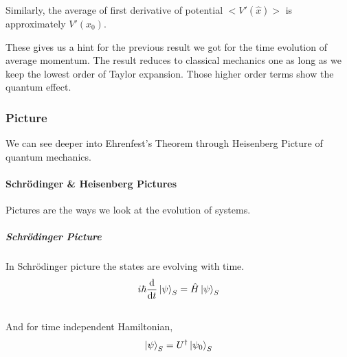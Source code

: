 \documentclass[letterpaper,10pt,english]{sphinxmanual}
\def\d{{\rm d}}
\begin{document}
Similarly, the average of first derivative of potential $<V'(\hat x)>$ is approximately $V'(x_0)$.

These gives us a hint for the previous result we got for the time evolution of average momentum. The result reduces to classical mechanics one as long as we keep the lowest order of Taylor expansion. Those higher order terms show the quantum effect.


\subsubsection{Picture}
\label{QuantumMechanics:picture}
We can see deeper into Ehrenfest's Theorem through Heisenberg Picture of quantum mechanics.


\paragraph{Schrödinger \& Heisenberg Pictures}
\label{QuantumMechanics:schrodinger-heisenberg-pictures}
Pictures are the ways we look at the evolution of systems.


\subparagraph{Schrödinger Picture}
\label{QuantumMechanics:schrodinger-picture}
In Schrödinger picture the states are evolving with time.
\begin{gather}
\begin{split}i\hbar \frac{\d}{\d t} \ket{\psi} _ S = \hat H \ket{\psi} _ S\end{split}\notag\\\begin{split}\end{split}\notag
\end{gather}
And for time independent Hamiltonian,
\begin{gather}
\begin{split}\ket{\psi}_S = U^\dagger \ket{\psi _ 0} _ S\end{split}\notag\\\begin{split}\end{split}\notag
\end{gather}
\end{document}
